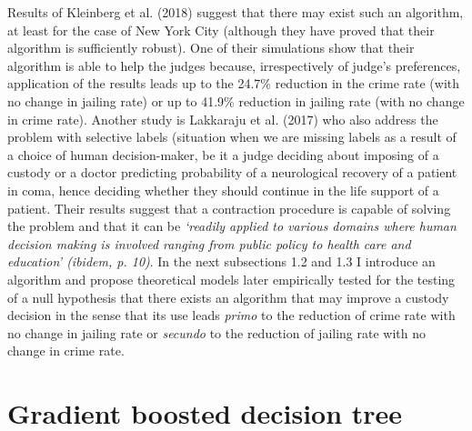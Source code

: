\documentclass[12pt, twoside]{book} %
\begin{document}
Results of Kleinberg et al. (2018) suggest that there may exist such an algorithm, at least for the case of New York City (although they have proved that their algorithm is sufficiently robust). One of their simulations show that their algorithm is able to help the judges because, irrespectively of judge's preferences, application of the results leads up to the 24.7\% reduction in the crime rate (with no change in jailing rate) or up to 41.9\% reduction in jailing rate (with no change in crime rate). Another study is Lakkaraju et al. (2017) who also address the problem with selective labels (situation when we are missing labels as a result of a choice of human decision-maker, be it a judge deciding about imposing of a custody or a doctor predicting probability of a neurological recovery of a patient in coma, hence deciding whether they should continue in the life support of a patient. Their results suggest that a contraction procedure is capable of solving the problem and that it can be \textit{‘readily applied to various domains where human decision making is involved ranging from public policy to health care and education’ (\textit{ibidem}, p. 10)}. \newline 
In the next subsections 1.2 and 1.3 I introduce an algorithm and propose theoretical models later empirically tested for the testing of a null hypothesis that there exists an algorithm that may improve a custody decision in the sense that its use leads \textit{primo} to the reduction of crime rate with no change in jailing rate or \textit{secundo} to the reduction of jailing rate with no change in crime rate. 




\section{Gradient boosted decision tree}    %
 \label{1.2}
\end{document}
